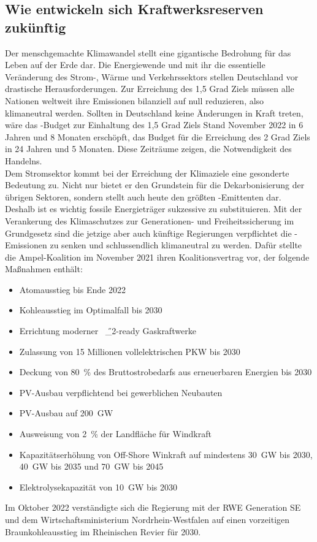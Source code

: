 		
	\subsection{Wie entwickeln sich Kraftwerksreserven zukünftig}	
	Der menschgemachte Klimawandel stellt eine gigantische Bedrohung für das Leben auf der Erde dar. Die Energiewende und mit ihr die essentielle Veränderung des Strom-, Wärme und Verkehrssektors stellen Deutschland vor drastische Herausforderungen. Zur Erreichung des 1,5 Grad Ziels müssen alle Nationen weltweit ihre Emissionen bilanziell auf null reduzieren, also klimaneutral werden. Sollten in Deutschland keine Änderungen in Kraft treten, wäre das \SI{}{\COtwo}-Budget zur Einhaltung des 1,5 Grad Ziels Stand November 2022 in 6 Jahren und 8 Monaten erschöpft, das Budget für die Erreichung des 2 Grad Ziels in 24 Jahren und 5 Monaten. Diese Zeiträume zeigen, die Notwendigkeit des Handelns.\cite{CO2_Uhr} \\
	
	Dem Stromsektor kommt bei der Erreichung der Klimaziele eine gesonderte Bedeutung zu. Nicht nur bietet er den Grundstein für die Dekarbonisierung der übrigen Sektoren, sondern stellt auch heute den größten \SI{}{\COtwo}-Emittenten dar.\cite{Umweltbundesamt_Emissionen} Deshalb ist es wichtig fossile Energieträger sukzessive zu substituieren. Mit der Verankerung des Klimaschutzes zur Generationen- und Freiheitssicherung im Grundgesetz sind die jetzige aber auch künftige Regierungen verpflichtet die \SI{}{\COtwo}-Emissionen zu senken und schlussendlich klimaneutral zu werden. Dafür stellte die Ampel-Koalition im November 2021 ihren Koalitionsvertrag vor, der folgende Maßnahmen enthält\cite{Koalitionsvertrag}:
		\begin{itemize}
			\item Atomausstieg bis Ende 2022
			\item Kohleausstieg im Optimalfall bis 2030
			\item Errichtung moderner \SI{}{\H{_2}}-ready Gaskraftwerke
			\item Zulassung von 15 Millionen vollelektrischen PKW bis 2030
			\item Deckung von \SI{80}{\percent} des Bruttostrobedarfs aus erneuerbaren Energien bis 2030
			\item PV-Ausbau verpflichtend bei gewerblichen Neubauten
			\item PV-Ausbau auf \SI{200}{\giga \watt}
			\item Ausweisung von \SI{2}{\percent} der Landfläche für Windkraft
			\item Kapazitätserhöhung von Off-Shore Winkraft auf mindestens \SI{30}{\giga \watt} bis 2030, \SI{40}{\giga \watt} bis 2035 und \SI{70}{\giga \watt} bis 2045
			\item Elektrolysekapazität von \SI{10}{\giga \watt} bis 2030
		\end{itemize}
		Im Oktober 2022 verständigte sich die Regierung mit der RWE Generation SE und dem Wirtschaftsministerium Nordrhein-Westfalen auf einen vorzeitigen Braunkohleausstieg im Rheinischen Revier für 2030.\cite{Kohleausstieg_RWE} \\
		

